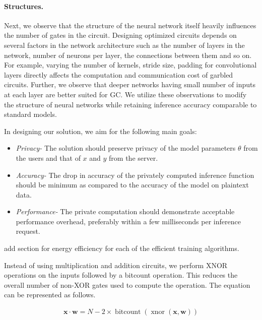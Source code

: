 \paragraph{Structures.}
Next, we observe that the structure of the neural network itself heavily influences the number of gates in the circuit. Designing optimized circuits depends on several factors in the network architecture such as the number of layers in the network, number of neurons per layer, the connections between them and so on. For example, varying the number of kernels, stride size, padding  for convolutional layers directly affects the computation and communication cost of garbled circuits.
Further, we observe that deeper networks having small number of inputs at each layer are better suited for GC. We utilize these observations to modify the structure of neural networks while retaining inference accuracy comparable to standard models.

In designing our solution, we aim for the following main goals:

\begin{itemize}
\item {\em Privacy-}
The solution should preserve privacy of the model parameters $\theta$ from the users and that of $x$ and $y$ from the server.

\item {\em Accuracy-}
The drop in accuracy of the privately computed inference function should be minimum as compared to the accuracy of the model on plaintext data.

\item {\em Performance-}
The private computation should demonstrate acceptable performance overhead, preferably within a few milliseconds per inference request.

\end{itemize}


add section for energy efficiency for each of the efficient training algorithms.

Instead of using multiplication and addition circuits, we perform XNOR operations on the inputs followed by a bitcount operation. This reduces the overall number of non-XOR gates used to compute the operation. The equation can be represented as follows.

\begin{align}
\mathbf{x} \cdot \mathbf{w} =
N - 2\times\operatorname{bitcount}(\operatorname{xnor}(\mathbf{x}, \mathbf{w}))
\end{align}

